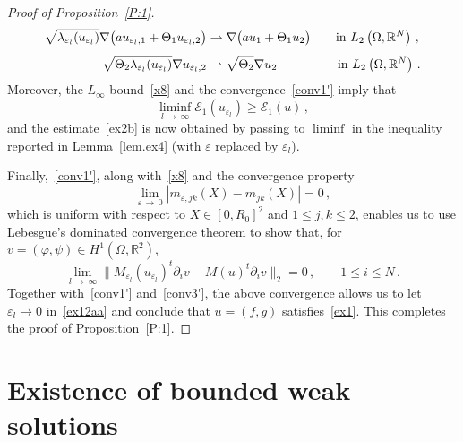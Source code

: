 \documentclass[10pt]{amsart}
\theoremstyle{definition}\newtheorem{defi}[theo]{Definition}\newtheorem{rema}[theo]{Remark}\newtheorem{exam}[theo]{Example}\newtheorem{exem}[theo]{Example}\newtheorem{nota}[theo]{Notation}
\newcommand{\bbR}{\mathbb{R}}
\newcommand{\clE}{\mathcal{E}}
\begin{document}
\begin{proof}[Proof of Proposition~\ref{P:1}]
\begin{align*}
\sqrt{\lambda_{\varepsilon_l}(u_{\varepsilon_l})} \nabla \big(a u_{\varepsilon_l,1} + \Theta_1 u_{\varepsilon_l,2} \big) &
\rightharpoonup \nabla\big (a u_1 + \Theta_1 u_2\big) \qquad \text{in }L_2\left(\Omega,\bbR^{N}\right)\,, \\[1ex]
\sqrt{\Theta_2 \lambda_{\varepsilon_l}(u_{\varepsilon_l})} \nabla u_{\varepsilon_l,2} & \rightharpoonup \sqrt{\Theta_2}\nabla u_2 \mkern87mu \text{in }L_2\left(\Omega,\bbR^{N}\right)\,.
\end{align*}
Moreover, the $L_\infty$-bound~\eqref{x8} and the convergence~\eqref{conv1'} imply that
\begin{equation*}
\liminf_{l\,\to\,\infty} \clE_1(u_{\varepsilon_l}) \geq \clE_1(u)\,,
\end{equation*}
and the estimate~\eqref{ex2b} is now obtained by passing to $\liminf$ in the inequality reported in Lemma~\ref{lem.ex4} (with $\varepsilon$ replaced by $\varepsilon_l$).

Finally,~\eqref{conv1'}, along with~\eqref{x8} and the convergence property
\begin{equation*}
\lim_{\varepsilon\,\to\,0} \left| m_{\varepsilon,jk}(X) - m_{jk}(X) \right| = 0\,,
\end{equation*}
which is uniform with respect to $X\in [0,R_0]^2 $ and $1 \le j,k\le 2$, enables us to use Lebesgue's dominated convergence theorem to show that, for $v=(\varphi,\psi)\in H^1(\Omega,\bbR^2)$,
\begin{equation*}
\lim_{l\,\to\,\infty} \big\| M_{\varepsilon_l}(u_{\varepsilon_l})^t \partial_i v - M(u)^t \partial_i v \big\|_2 = 0\,, \qquad 1\le i \le N\,.
\end{equation*}
Together with~\eqref{conv1'} and~\eqref{conv3'}, the above convergence allows us to let $\varepsilon_l\to 0$ in~\eqref{ex12aa} and conclude that $u=(f,g)$ satisfies~\eqref{ex1}. This completes the proof of Proposition~\ref{P:1}.
\end{proof}



\section{Existence of bounded weak solutions}\label{sec3}
\end{document}
